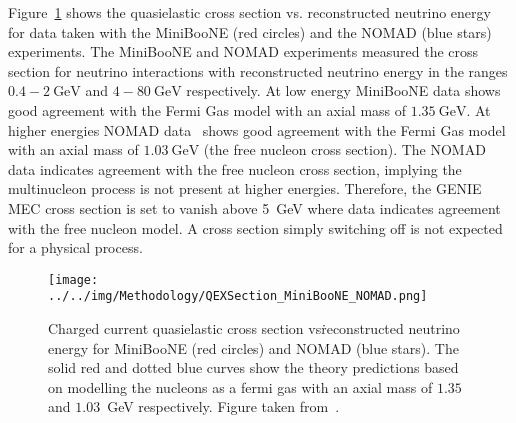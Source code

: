 Figure~\ref{fig:QEXSection_katori} shows the quasielastic cross
section vs. reconstructed neutrino energy for data taken with the
MiniBooNE (red circles) and the NOMAD (blue stars) experiments. The
MiniBooNE and NOMAD experiments measured the cross section for
neutrino interactions with reconstructed neutrino energy in the ranges
$0.4 - 2~\text{GeV}$ and $4 - 80~\text{GeV}$ respectively.
At low energy MiniBooNE data shows good agreement with the Fermi Gas
model with an axial mass of $1.35~\text{GeV}$. At higher energies
NOMAD data~\cite{lyubushkin2009study} shows good agreement with the
Fermi Gas model with an axial 
mass of $1.03~\text{GeV}$ (the free nucleon cross section). 
The NOMAD data indicates agreement with the free nucleon cross
section, implying the multinucleon process is not present at higher
energies. 
Therefore, the GENIE MEC cross section is set to vanish
above 5~GeV where data indicates agreement with the free nucleon
model. 
A cross section simply switching off is not expected for a physical
process.

\begin{figure}
  \centering
\texttt{[image: ../../img/Methodology/QEXSection\_MiniBooNE\_NOMAD.png]}
  \caption{
    Charged current quasielastic cross section vs\. reconstructed
    neutrino energy for MiniBooNE (red circles) and NOMAD (blue
    stars). The solid red and dotted blue curves show the theory
    predictions based on modelling the nucleons as a fermi gas with an
    axial mass of $1.35$ and $1.03$~GeV respectively. Figure taken
    from~\cite{katori2008measurement}.
  } 
  \label{fig:QEXSection_katori}
\end{figure}



